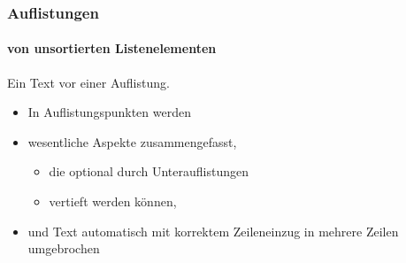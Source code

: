 \begin{frame}
    \frametitle{Auflistungen}
    \framesubtitle{von unsortierten Listenelementen}

    Ein Text vor einer Auflistung.
    \begin{itemize}
        \item In Auflistungspunkten werden
        \item wesentliche Aspekte zusammengefasst,
        \begin{itemize}
            \item die optional durch Unterauflistungen
            \item vertieft werden k\"onnen,
        \end{itemize}
        \item und Text automatisch mit korrektem Zeileneinzug in mehrere Zeilen umgebrochen
    \end{itemize}
\end{frame}